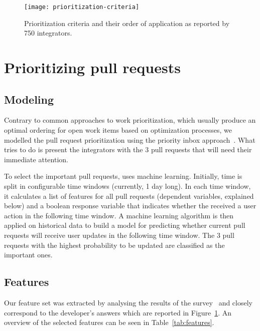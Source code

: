 \documentclass[conference]{IEEEtran}
\begin{document}
\begin{figure}[t]
  \begin{center}
    \texttt{[image: prioritization-criteria]}
  \end{center}
  \caption{Prioritization criteria and their order of application as reported by
  750 integrators.}
  \label{fig:prioritization}
\end{figure}


\section{Prioritizing pull requests}

\subsection{Modeling} Contrary to common approaches to work prioritization, which usually produce
an optimal ordering for open work items based on optimization processes, we
modelled the pull request prioritization using the priority inbox approach~\cite{Conway2011}.
What \prioritizer tries to do is present the integrators with the 3 pull
requests that will need their immediate attention. 

To select the important pull requests, \prioritizer uses machine learning.
Initially, time is split in configurable time windows (currently, 1 day long).
In each time window, it calculates a list of features for all pull requests
(dependent variables, explained below) and a boolean response variable that
indicates whether the received a user action in the following time window. A
machine learning algorithm is then applied on historical data to build a model
for predicting whether current pull requests will receive user updates in the
following time window. The 3 pull requests with the highest probability to be
updated are classified as the important ones.

\subsection{Features}
\label{sec:features}
Our feature set was extracted by analysing the results of the survey~\cite{GZSD15} and
closely correspond to the developer's answers which are reported in
Figure~\ref{fig:prioritization}. An overview of the selected features can
be seen in Table~\ref{tab:features}.
\end{document}
